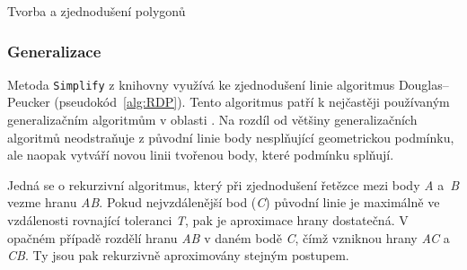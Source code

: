 \begin{algorithm}
\caption{Tvorba a zjednodušení polygonů}
\label{alg:polygon}
    \begin{algorithmic}[1] 
			\ELSE
			\ENDIF
		\ENDWHILE	
	\ENDWHILE
    \end{algorithmic}
\end{algorithm}

\newpage
\subsubsection{Generalizace}
Metoda \texttt{Simplify} z knihovny  využívá ke zjednodušení
linie algoritmus Douglas–Peucker (pseudokód~\ref{alg:RDP}). Tento
algoritmus patří k nejčastěji používaným generalizačním algoritmům v
oblasti . Na rozdíl od většiny generalizačních algoritmů
neodstraňuje z původní linie body nesplňující geometrickou podmínku,
ale naopak vytváří novou linii tvořenou body, které podmínku splňují.
	
Jedná se o rekurzivní algoritmus, který při zjednodušení řetězce mezi
body \textit{A} a~\textit{B} vezme hranu \textit{AB}. Pokud
nejvzdálenější bod (\textit{C}) původní linie je maximálně ve
vzdálenosti rovnající toleranci \textit{T}, pak je aproximace hrany
dostatečná. V opačném případě rozdělí hranu \textit{AB} v daném bodě
\textit{C}, čímž vzniknou hrany \textit{AC} a \textit{CB}. Ty jsou pak
rekurzivně aproximovány stejným
postupem. \cite{hershberger1992speeding}
	

